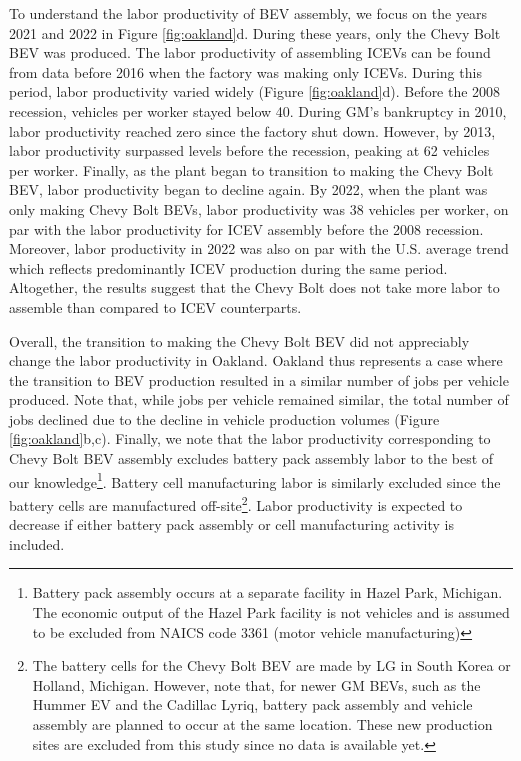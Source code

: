 \documentclass[sn-mathphys,Numbered]{sn-jnl}%
\begin{document}
To understand the labor productivity of BEV assembly, we focus on the years 2021 and 2022 in Figure \ref{fig:oakland}d. During these years, only the Chevy Bolt BEV was produced. The labor productivity of assembling ICEVs can be found from data before 2016 when the factory was making only ICEVs. During this period, labor productivity varied widely (Figure \ref{fig:oakland}d). Before the 2008 recession, vehicles per worker stayed below 40. During GM's bankruptcy in 2010, labor productivity reached zero since the factory shut down. However, by 2013, labor productivity surpassed levels before the recession, peaking at 62 vehicles per worker. Finally, as the plant began to transition to making the Chevy Bolt BEV, labor productivity began to decline again. By 2022, when the plant was only making Chevy Bolt BEVs, labor productivity was 38 vehicles per worker, on par with the labor productivity for ICEV assembly before the 2008 recession. Moreover, labor productivity in 2022 was also on par with the U.S. average trend which reflects predominantly ICEV production during the same period. Altogether, the results suggest that the Chevy Bolt does not take more labor to assemble than compared to ICEV counterparts.  %

Overall, the transition to making the Chevy Bolt BEV did not appreciably change the labor productivity in Oakland. Oakland thus represents a case where the transition to BEV production resulted in a similar number of jobs per vehicle produced. Note that, while jobs per vehicle remained similar, the total number of jobs declined due to the decline in vehicle production volumes (Figure \ref{fig:oakland}b,c). Finally, we note that the labor productivity corresponding to Chevy Bolt BEV assembly excludes battery pack assembly labor to the best of our knowledge\footnote{Battery pack assembly occurs at a separate facility in Hazel Park, Michigan. The economic output of the Hazel Park facility is not vehicles and is assumed to be excluded from NAICS code 3361 (motor vehicle manufacturing)}. Battery cell manufacturing labor is similarly excluded since the battery cells are manufactured off-site\footnote{The battery cells for the Chevy Bolt BEV are made by LG in South Korea or Holland, Michigan\cite{Motors2021-mf, Motors2021-bm}. However, note that, for newer GM BEVs, such as the Hummer EV and the Cadillac Lyriq, battery pack assembly and vehicle assembly are planned to occur at the same location. These new production sites are excluded from this study since no data is available yet.}. Labor productivity is expected to decrease if either battery pack assembly or cell manufacturing activity is included.
\end{document}
